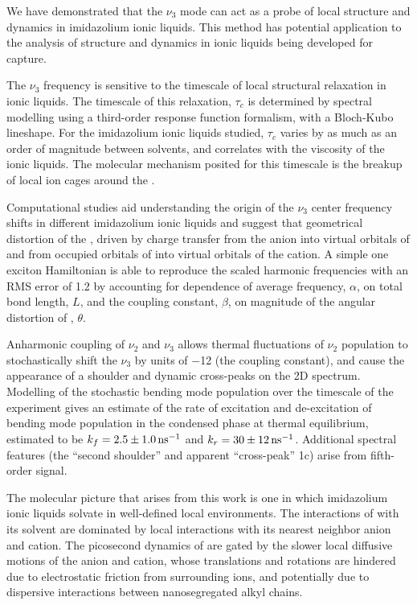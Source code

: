 \documentclass[%
  class = book,%
  crop = false,%
  float = true,%
  multi = true,%
  preview = false,%
]{standalone}
\begin{document}
{We have demonstrated that the  \(\nu_3\) mode can act as a probe of local structure and dynamics in imidazolium ionic liquids. This method has potential application to the analysis of structure and dynamics in ionic liquids being developed for  capture.

The \(\nu_3\) frequency is sensitive to the timescale of local structural relaxation in ionic liquids. The timescale of this relaxation, \(\tau_c\) is determined by spectral modelling using a third-order response function formalism, with a Bloch-Kubo lineshape. For the imidazolium ionic liquids studied, \(\tau_c\) varies by as much as an order of magnitude between solvents, and correlates with the viscosity of the ionic liquids. The molecular mechanism posited for this timescale is the breakup of local ion cages around the .

Computational studies aid understanding the origin of the \(\nu_3\) center frequency shifts in different imidazolium ionic liquids and suggest that geometrical distortion of the , driven by charge transfer from the anion into virtual orbitals of  and from occupied orbitals of  into virtual orbitals of the cation. A simple one exciton Hamiltonian is able to reproduce the scaled harmonic frequencies with an RMS error of \SI{1.2}{\wavenumber} by accounting for dependence of average frequency, \(\alpha\), on total bond length, \(L\), and the coupling constant, \(\beta\), on magnitude of the angular distortion of , \(\theta\).

Anharmonic coupling of \(\nu_2\) and \(\nu_3\) allows thermal fluctuations of \(\nu_2\) population to stochastically shift the  \(\nu_3\) by units of \SI{-12}{\wavenumber} (the coupling constant), and cause the appearance of a shoulder and dynamic cross-peaks on the 2D spectrum. Modelling of the stochastic bending mode population over the timescale of the experiment gives an estimate of the rate of excitation and de-excitation of bending mode population in the condensed phase at thermal equilibrium, estimated to be \(k_{f} = \SI{2.5 \pm 1}{\per\ns}\) and \(k_r = \SI{30\pm12}{\per\ns}\). Additional spectral features (the ``second shoulder'' and apparent ``cross-peak'' 1c) arise from fifth-order signal.

The molecular picture that arises from this work is one in which imidazolium ionic liquids solvate  in well-defined local environments. The interactions of  with its solvent are dominated by local interactions with its nearest neighbor anion and cation. The picosecond dynamics of  are gated by the slower local diffusive motions of the anion and cation, whose translations and rotations are hindered due to electrostatic friction from surrounding ions, and potentially due to dispersive interactions between nanosegregated alkyl chains.

}
\end{document}
